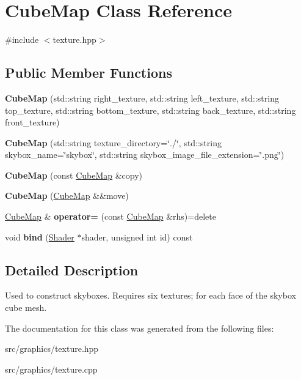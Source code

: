 \hypertarget{class_cube_map}{}\section{Cube\+Map Class Reference}
\label{class_cube_map}


{\ttfamily \#include $<$texture.\+hpp$>$}

\subsection*{Public Member Functions}
\begin{DoxyCompactItemize}
\item 
\mbox{\label{class_cube_map_a2894dc1765bf0a0534b84b6ac00320c9}} 
{\bfseries Cube\+Map} (std\+::string right\+\_\+texture, std\+::string left\+\_\+texture, std\+::string top\+\_\+texture, std\+::string bottom\+\_\+texture, std\+::string back\+\_\+texture, std\+::string front\+\_\+texture)
\item 
\mbox{\label{class_cube_map_a0d383d15339d920042a6b7c4209f8ab6}} 
{\bfseries Cube\+Map} (std\+::string texture\+\_\+directory=\char`\"{}./\char`\"{}, std\+::string skybox\+\_\+name=\char`\"{}skybox\char`\"{}, std\+::string skybox\+\_\+image\+\_\+file\+\_\+extension=\char`\"{}.png\char`\"{})
\item 
\mbox{\label{class_cube_map_a687da9c791db37544c3aab73210b1135}} 
{\bfseries Cube\+Map} (const \mbox{\hyperlink{class_cube_map}{Cube\+Map}} \&copy)
\item 
\mbox{\label{class_cube_map_a72a09700337e9eabfb3f88bb0bae768e}} 
{\bfseries Cube\+Map} (\mbox{\hyperlink{class_cube_map}{Cube\+Map}} \&\&move)
\item 
\mbox{\label{class_cube_map_a847365d5a2e986c553d46bece2a004ad}} 
\mbox{\hyperlink{class_cube_map}{Cube\+Map}} \& {\bfseries operator=} (const \mbox{\hyperlink{class_cube_map}{Cube\+Map}} \&rhs)=delete
\item 
\mbox{\label{class_cube_map_a5d022a37c170ed6f7acb2354a6cae45d}} 
void {\bfseries bind} (\mbox{\hyperlink{class_shader}{Shader}} $\ast$shader, unsigned int id) const
\end{DoxyCompactItemize}


\subsection{Detailed Description}
Used to construct skyboxes. Requires six textures; for each face of the skybox cube mesh. 

The documentation for this class was generated from the following files\+:\begin{DoxyCompactItemize}
\item 
src/graphics/texture.\+hpp\item 
src/graphics/texture.\+cpp\end{DoxyCompactItemize}
